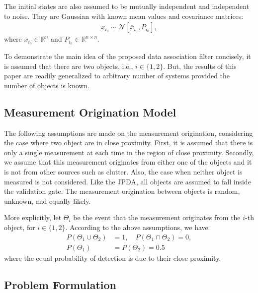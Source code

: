 \documentclass[letterpaper, 10pt, conference]{ieeeconf}
\renewcommand{\Re}{\ensuremath{\mathbb{R}}}
\begin{document}
The initial states are also assumed to be mutually independent and independent to noise. They are Gaussian with known mean values and covariance matrices:
\begin{align}
x_{i_0} \sim \mathcal{N}[\bar x_{i_0}, P_{i_0}],\label{eqn:xi0}
\end{align}
where $\bar x_{i_0}\in\Re^n$ and $P_{i_0}\in\Re^{n\times n}$. 

To demonstrate the main idea of the proposed data association filter concisely, it is assumed that there are two objects, i.e., $i\in\{1,2\}$. But, the results of this paper are readily generalized to arbitrary number of systems provided the number of objects is known.


\subsection{Measurement Origination Model}
\label{DAP}


The following assumptions are made on the measurement origination, considering the case where two object are in close proximity. First, it is assumed that there is only a single measurement at each time in the region of close proximity. Secondly, we assume that this measurement originates from either one of the objects and it is not from other sources such as clutter. Also, the case when neither object is measured is not considered. Like the JPDA, all objects are assumed to fall inside the validation gate. The measurement origination between objects is random, unknown, and equally likely. 

More explicitly, let $\Theta_i$ be the event that the measurement originates from the $i$-th object, for $i\in\{1,2\}$. According to the above assumptions, we have
\begin{align}
P(\Theta_1\cup \Theta_2)&=1,\quad
P(\Theta_1\cap \Theta_2)=0,\\
P(\Theta_1)&=P(\Theta_2)=0.5\label{eqn:MeaOrig}
\end{align}
where the equal probability of detection is due to their close proximity.

\subsection{Problem Formulation}
\end{document}
